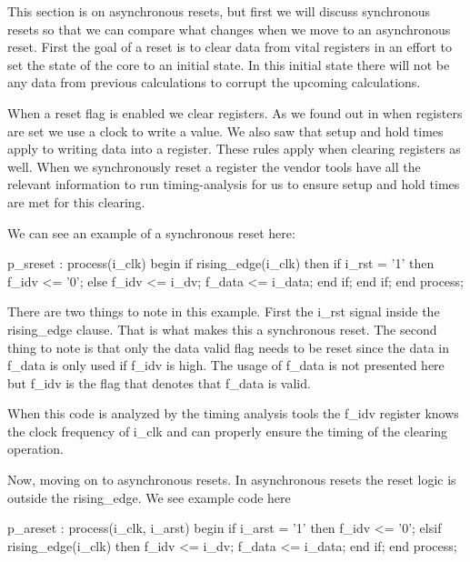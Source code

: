 This section is on asynchronous resets, but first we will discuss synchronous resets so that we can compare what changes when we move to an asynchronous reset. First the goal of a reset is to clear data from vital registers in an effort to set the state of the core to an initial state. In this initial state there will not be any data from previous calculations to corrupt the upcoming calculations. 

When a reset flag is enabled we clear registers. As we found out in  when registers are set we use a clock to write a value. We also saw that setup and hold times apply to writing data into a register. These rules apply when clearing registers as well. When we synchronously reset a register the vendor tools have all the relevant information to run timing-analysis for us to ensure setup and hold times are met for this clearing. 

We can see an example of a synchronous reset here:

\begin{VHDLlisting}[tabsize=4]
p_sreset : process(i_clk)
begin
    if rising_edge(i_clk) then
        if i_rst = '1' then
            f_idv <= '0';
        else
            f_idv <= i_dv;
            f_data <= i_data;		
        end if;	
    end if;
end process;
\end{VHDLlisting}

There are two things to note in this example. First the i\_rst signal inside the rising\_edge clause. That is what makes this a synchronous reset. The second thing to note is that only the data valid flag needs to be reset since the data in f\_data is only used if f\_idv is high. The usage of f\_data is not presented here but f\_idv is the flag that denotes that f\_data is valid. 

When this code is analyzed by the timing analysis tools the f\_idv register knows the clock frequency of i\_clk and can properly ensure the timing of the clearing operation. 

Now, moving on to asynchronous resets. In asynchronous resets the reset logic is outside the rising\_edge. We see example code here

\begin{VHDLlisting}[tabsize=4]
p_areset : process(i_clk, i_arst)
begin
    if i_arst = '1' then
        f_idv <= '0';
    elsif rising_edge(i_clk) then
        f_idv <= i_dv;
        f_data <= i_data;		
    end if;
end process;
\end{VHDLlisting}

